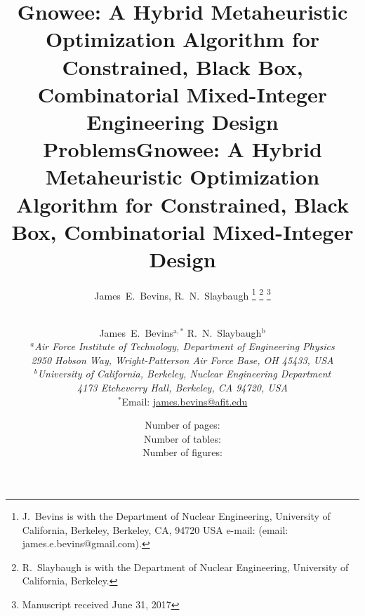 \documentclass{article}                                                                           %
\begin{document}
\title{Gnowee: A Hybrid Metaheuristic Optimization Algorithm for Constrained, Black Box, Combinatorial Mixed-Integer Engineering Design Problems}


\author{James~E.~Bevins, %
        R.\ N.\ Slaybaugh%
\thanks{J.\ Bevins is with the Department
of Nuclear Engineering, University of California, Berkeley, Berkeley,
CA, 94720 USA e-mail: (email: james.e.bevins@gmail.com).}%
\thanks{R.\ Slaybaugh is with the Department
of Nuclear Engineering, University of California, Berkeley.}%
\thanks{Manuscript received June 31, 2017}}

\title{Gnowee: A Hybrid Metaheuristic Optimization Algorithm for Constrained, Black Box, Combinatorial Mixed-Integer Design} %

\author{
\vspace{20mm}
\\James~E.~Bevins$^{\text{a},\ast}$   R.\ N.\ Slaybaugh$^{\text{b}}$ \\[4pt] %
\textit{$^a$Air Force Institute of Technology, Department of Engineering Physics}\\[-10pt]       %
\textit{2950 Hobson Way, Wright-Patterson Air Force Base, OH 45433, USA} \\[-5pt]
\textit{$^b$University of California, Berkeley, Nuclear Engineering Department} \\ [-10pt]
\textit{4173 Etcheverry Hall, Berkeley, CA 94720, USA} \\ [-2pt]
{$^\ast$Email: \href{mailto:james.bevins@afit.edu}{james.bevins@afit.edu}}}       %

\date{                               %
\vspace{40mm}
Number of pages: \pageref{LastPage} \\
Number of tables: \totaltables \\
Number of figures: \totalfigures \\}
\end{document}
